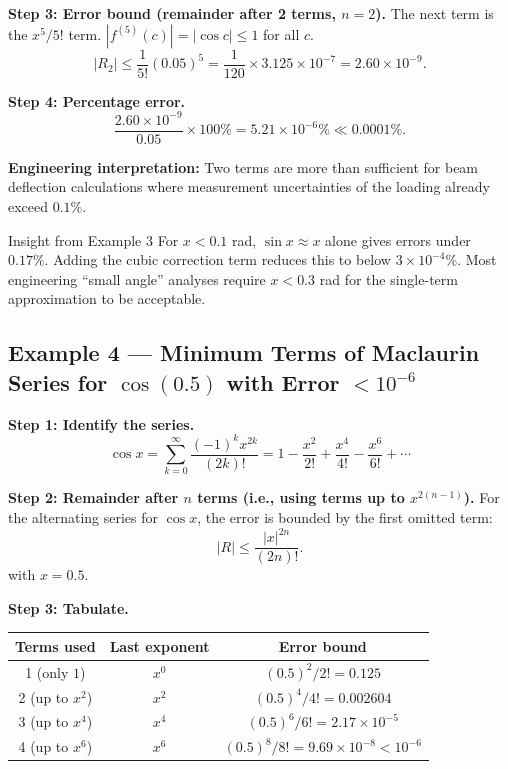 \documentclass[12pt,a4paper]{article}
\begin{document}
\textbf{Step 3: Error bound (remainder after 2 terms, \(n=2\)).}
The next term is the \(x^5/5!\) term.
\(|f^{(5)}(c)| = |\cos c| \leq 1\) for all \(c\).
\[
  |R_2| \leq \frac{1}{5!}(0.05)^5
          = \frac{1}{120}\times 3.125\times10^{-7}
          = 2.60\times10^{-9}.
\]

\textbf{Step 4: Percentage error.}
\[
  \frac{2.60\times10^{-9}}{0.05} \times 100\%
  = 5.21\times10^{-6}\% \ll 0.0001\%.
\]

\textbf{Engineering interpretation:} Two terms are more than sufficient for beam
deflection calculations where measurement uncertainties of the loading already exceed
\(0.1\%\).

\begin{learnbox}{Insight from Example 3}
For \(x < 0.1\) rad, \(\sin x \approx x\) alone gives errors under \(0.17\%\).
Adding the cubic correction term reduces this to below \(3\times10^{-4}\%\).
Most engineering ``small angle'' analyses require \(x < 0.3\) rad for the single-term
approximation to be acceptable.
\end{learnbox}

\subsection*{Example 4 --- Minimum Terms of Maclaurin Series for \(\cos(0.5)\) with Error
\(< 10^{-6}\)}

\textbf{Step 1: Identify the series.}
\[
  \cos x = \sum_{k=0}^{\infty}\frac{(-1)^k x^{2k}}{(2k)!}
         = 1 - \frac{x^2}{2!} + \frac{x^4}{4!} - \frac{x^6}{6!} + \cdots
\]

\textbf{Step 2: Remainder after \(n\) terms (i.e., using terms up to \(x^{2(n-1)}\)).}
For the alternating series for \(\cos x\), the error is bounded by the first omitted term:
\[
  |R| \leq \frac{|x|^{2n}}{(2n)!}.
\]
with \(x = 0.5\).

\textbf{Step 3: Tabulate.}
\begin{center}
\begin{tabular}{ccc}
\toprule
Terms used & Last exponent & Error bound \\
\midrule
1 (only $1$)               & $x^0$ & $(0.5)^2/2! = 0.125$              \\
2 (up to $x^2$)            & $x^2$ & $(0.5)^4/4! = 0.002604$           \\
3 (up to $x^4$)            & $x^4$ & $(0.5)^6/6! = 2.17\times10^{-5}$  \\
4 (up to $x^6$)            & $x^6$ & $(0.5)^8/8! = 9.69\times10^{-8} < 10^{-6}$ \\
\bottomrule
\end{tabular}
\end{center}
\end{document}
